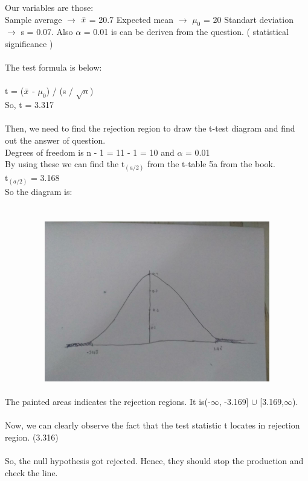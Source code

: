 \documentclass[12pt]{article}
\begin{document}
Our variables are those:\\ Sample average $\rightarrow$ $\Bar{x}$ = 20.7  Expected mean $\rightarrow$  $\mu_0$ = 20 Standart deviation $\rightarrow$ s = 0.07. Also $\alpha$ = 0.01 is can be deriven from the question. ( statistical significance ) \\
\\
The test formula is below:\\
\\
t = ($\Bar{x}$ - $\mu_0$) / (s / $\sqrt{n}$)\\
So, t = 3.317\\
\\
Then, we need to find the rejection region to draw the t-test diagram and find out the answer of question. \\
Degrees of freedom is n - 1 = 11 - 1 = 10 and $\alpha$ = 0.01\\ 
By using these we can find the t$_(a/2)$ from the t-table 5a from the book.\\
t$_(a/2)$ = 3.168\\
So the diagram is:\\
\\\
\includegraphics[width=14cm, height=7cm]{diagram1}\\
\\ 
The painted areas indicates the rejection regions. It is(-$\infty$, -3.169] $\cup$ [3.169,$\infty$).\\
\\
Now, we can clearly observe the fact that the test statistic t locates in rejection region. (3.316)\\
\\
So, the null hypothesis got rejected. Hence, they should stop the production and check the line.\\

 
    
\end{document}
